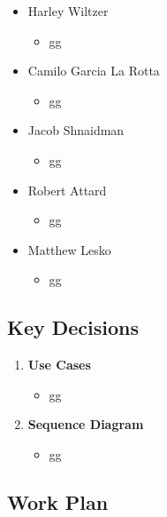 \documentclass[12pt]{article}
\begin{document}

 \begin{itemize}
     \item Harley Wiltzer
 	\begin{itemize}
 		\item gg
 	\end{itemize}
     \item Camilo Garcia La Rotta
     \begin{itemize}
         \item gg
     \end{itemize}
     \item Jacob Shnaidman
 		\begin{itemize}
 			\item gg
 		\end{itemize}
     \item Robert Attard
     \begin{itemize}
         \item gg
     \end{itemize}
     \item Matthew Lesko
     \begin{itemize}
     	\item gg
     \end{itemize}
 \end{itemize}

 \subsection{Key Decisions}


 \begin{enumerate}
     \item \textbf{Use Cases}
     \begin{itemize}
     	\item gg
     \end{itemize}
     \item \textbf{Sequence Diagram}
     \begin{itemize}
         \item gg
     \end{itemize}
 \end{enumerate}

 \subsection{Work Plan}
\end{document}
